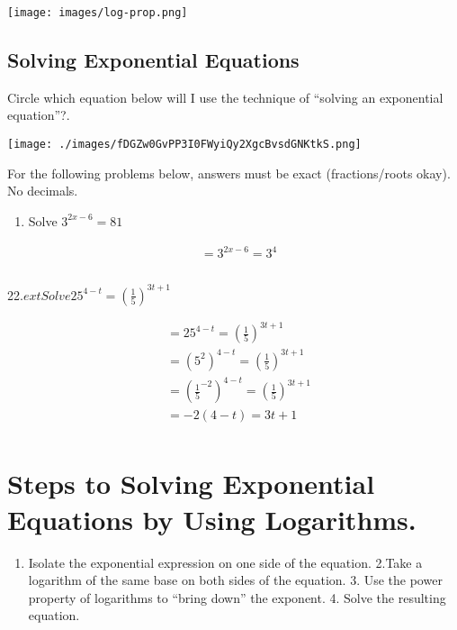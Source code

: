 \documentclass{book}
\begin{document}
\texttt{[image: images/log-prop.png]}

\subsection{Solving Exponential
	Equations}\label{solving-exponential-equations}

Circle which equation below will I use the technique of ``solving an
exponential equation''?.

\texttt{[image: ./images/fDGZw0GvPP3I0FWyiQy2XgcBvsdGNKtkS.png]}

For the following problems below, answers must be exact (fractions/roots
okay). No decimals.

\begin{enumerate}
	\def\labelenumi{\arabic{enumi}.}
	\setcounter{enumi}{20}
	\tightlist
	\item
	      Solve \(3^{2x-6}=81\)
\end{enumerate}


	\begin{align}
		 & = 3^{2x-6}=3^4 \\ \\
	\end{align}


22.\(ext{Solve 25}^{4-t}=\left(\frac{1}{5}\right)^{3t+1}\)


	\begin{align}
		 & = 25^{4-t}=\left(\frac{1}{5}\right)^{3t+1} \\&= (5^2)^{4-t}=\left(\frac{1}{5}\right)^{3t+1} \\&= \left ({\frac{1}{5}}^{-2} \right )^{4-t}=\left(\frac{1}{5}\right)^{3t+1} \\&= -2(4-t) = 3t +1 \\
	\end{align}


\section{Steps to Solving Exponential Equations by Using
  Logarithms.}\label{steps-to-solving-exponential-equations-by-using-logarithms.}

\begin{enumerate}
	\def\labelenumi{\arabic{enumi}.}
	\tightlist
	\item
	      Isolate the exponential expression on one side of the equation. 2.Take
	      a logarithm of the same base on both sides of the equation. 3. Use the
	      power property of logarithms to ``bring down'' the exponent. 4. Solve
	      the resulting equation.
\end{enumerate}
\end{document}
